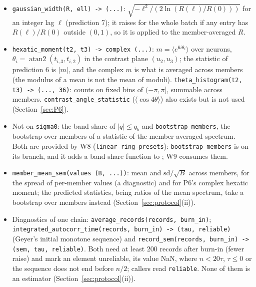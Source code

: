 \documentclass[11pt,a4paper]{article}
\newcommand{\code}[1]{\texttt{#1}}
\begin{document}
\begin{itemize}[nosep]
  \item \code{gaussian\_width(R, ell) -> (...)}: $\sqrt{-\ell^2/(2\ln(R(\ell)/R(0)))}$ for an integer lag $\ell$ (prediction 7); it raises for the whole batch if any entry has $R(\ell)/R(0)$ outside $(0, 1)$, so it is applied to the member-averaged $R$.
  \item \code{hexatic\_moment(t2, t3) -> complex (...)}: $m = \langle e^{6i\theta_i}\rangle$ over neurons, $\theta_i = \operatorname{atan2}(t_{i,3}, t_{i,2})$ in the contrast plane $(u_2, u_3)$; the statistic of prediction 6 is $|m|$, and the complex $m$ is what is averaged across members (the modulus of a mean is not the mean of moduli). \code{theta\_histogram(t2, t3) -> (..., 36)}: counts on fixed bins of $(-\pi, \pi]$, summable across members. \code{contrast\_angle\_statistic} ($\langle\cos4\theta\rangle$) also exists but is not used (Section~\ref{sec:P6}).
  \item Not on \code{sigma0}: the band share of $|q|\le q_b$ and \code{bootstrap\_members}, the bootstrap over members of a statistic of the member-averaged spectrum. Both are provided by W8 (\code{linear-ring-presets}): \code{bootstrap\_members} is on its branch, and it adds a band-share function to ; W9 consumes them.
  \item \code{member\_mean\_sem(values (B, ...))}: mean and $\mathrm{sd}/\sqrt B$ across members, for the spread of per-member values (a diagnostic) and for P6's complex hexatic moment; the predicted statistics, being ratios of the mean spectrum, take a bootstrap over members instead (Section~\ref{sec:protocol}(ii)).
  \item Diagnostics of one chain: \code{average\_records(records, burn\_in)}; \code{integrated\_autocorr\_time(records, burn\_in) -> (tau, reliable)} (Geyer's initial monotone sequence) and \code{record\_sem(records, burn\_in) -> (sem, tau, reliable)}. Both need at least $200$ records after burn-in (fewer raise) and mark an element unreliable, its value NaN, where $n < 20\tau$, $\tau\le0$ or the sequence does not end before $n/2$; callers read \code{reliable}. None of them is an estimator (Section~\ref{sec:protocol}(ii)).
\end{itemize}
\end{document}
